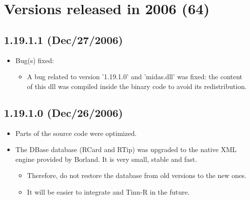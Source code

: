 
\section{Versions released in 2006 (64)}
\subsection*{1.19.1.1 (Dec/27/2006)}
\begin{itemize}
  \item Bug(s) fixed:
    \begin{itemize}
      \item A bug related to version '1.19.1.0' and 'midas.dll' was fixed:
        the content of this dll was compiled inside the binary code to avoid
        its redistribution.
    \end{itemize}
\end{itemize}


\subsection*{1.19.1.0 (Dec/26/2006)}
\begin{itemize}
  \item Parts of the source code were optimized.
  \item The DBase database (RCard and RTip) was upgraded to the native XML engine
    provided by Borland. It is very small, stable and fast.
    \begin{itemize}
      \item Therefore, do not restore the database from old versions to the new
        ones.
      \item It will be easier to integrate \RR{} and Tinn-R in the future.
    \end{itemize}
\end{itemize}


